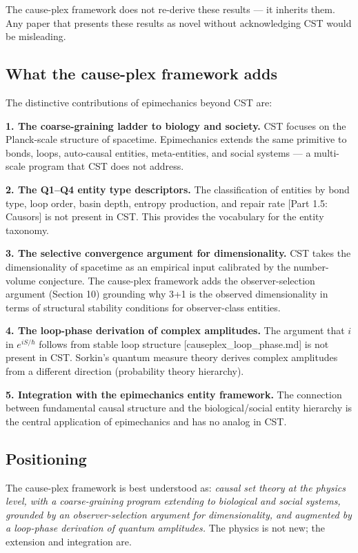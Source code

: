 \documentclass[11pt]{article}
\theoremstyle{definition}
\theoremstyle{remark}
\begin{document}
The cause-plex framework does not re-derive these results --- it
inherits them. Any paper that presents these results as novel without
acknowledging CST would be misleading.

\subsection{What the cause-plex framework
adds}\label{what-the-cause-plex-framework-adds}

The distinctive contributions of epimechanics beyond CST are:

\textbf{1. The coarse-graining ladder to biology and society.} CST
focuses on the Planck-scale structure of spacetime. Epimechanics extends
the same primitive to bonds, loops, auto-causal entities, meta-entities,
and social systems --- a multi-scale program that CST does not address.

\textbf{2. The Q1--Q4 entity type descriptors.} The classification of
entities by bond type, loop order, basin depth, entropy production, and
repair rate {[}Part 1.5: Causors{]} is not present in CST. This provides
the vocabulary for the entity taxonomy.

\textbf{3. The selective convergence argument for dimensionality.} CST
takes the dimensionality of spacetime as an empirical input calibrated
by the number-volume conjecture. The cause-plex framework adds the
observer-selection argument (Section 10) grounding why 3+1 is the
observed dimensionality in terms of structural stability conditions for
observer-class entities.

\textbf{4. The loop-phase derivation of complex amplitudes.} The
argument that \(i\) in \(e^{iS/\hbar}\) follows from stable loop
structure {[}causeplex\_loop\_phase.md{]} is not present in CST.
Sorkin's quantum measure theory derives complex amplitudes from a
different direction (probability theory hierarchy).

\textbf{5. Integration with the epimechanics entity framework.} The
connection between fundamental causal structure and the
biological/social entity hierarchy is the central application of
epimechanics and has no analog in CST.

\subsection{Positioning}\label{positioning}

The cause-plex framework is best understood as: \emph{causal set theory
at the physics level, with a coarse-graining program extending to
biological and social systems, grounded by an observer-selection
argument for dimensionality, and augmented by a loop-phase derivation of
quantum amplitudes.} The physics is not new; the extension and
integration are.
\end{document}
